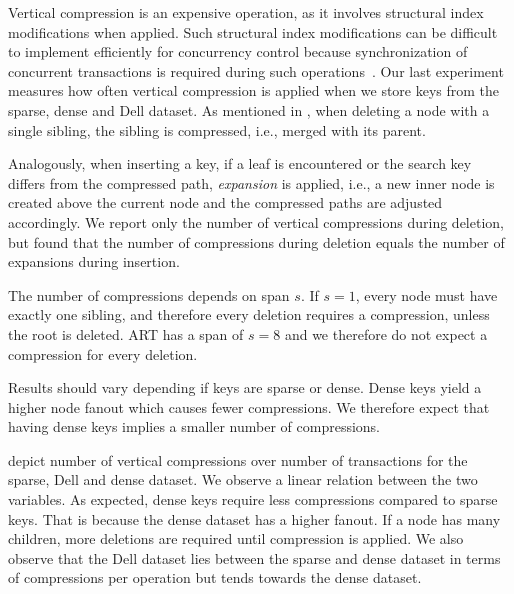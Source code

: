 \documentclass[abstracton,12pt]{scrartcl}
\theoremstyle{definition}
\begin{document}
Vertical compression is an expensive operation, as it involves structural index
modifications when applied. Such structural index modifications can be
difficult to implement efficiently for concurrency control because 
synchronization of concurrent
transactions is required during such operations~\cite{wellenzohn2017wapi}.
Our last experiment measures how often vertical compression is applied
when we store keys from the sparse, dense and Dell dataset.
As mentioned in , when deleting a node with
a single sibling, the sibling is compressed, i.e., merged with its parent.

Analogously, when inserting a key, if a leaf is encountered or the search key
differs from the compressed path, \textit{expansion} is applied, i.e., a new 
inner node is created above the current node and the compressed paths are 
adjusted accordingly. We report only the number of vertical compressions during
deletion, but found that the number of compressions during deletion equals the 
number of expansions during insertion.

The number of compressions
depends on span $s$. If $s=1$, every node must have exactly one sibling,
and therefore every deletion requires a compression, unless the root is
deleted. ART has a span of $s=8$ and we therefore do not expect a compression 
for every deletion.

Results should vary depending if keys are sparse or dense. Dense keys
yield a higher node fanout which causes fewer compressions.
We therefore expect that having dense keys implies a smaller number
of compressions.

depict number of vertical
compressions over number of transactions for the sparse, Dell and dense 
dataset. We observe a linear relation between the two variables. As expected,
dense keys require less compressions compared to sparse keys. That is because
the dense dataset has a higher fanout. If a node has many children, more
deletions are required until compression is applied.
We also observe that the Dell dataset lies between the sparse and dense
dataset in terms of compressions per operation but tends towards the 
dense dataset.
\end{document}
